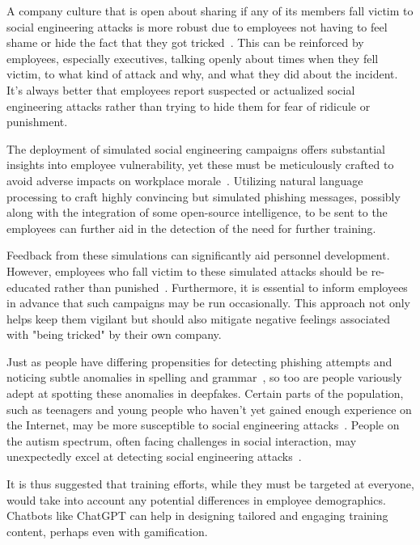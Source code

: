 A company culture that is open about sharing if any of its members fall victim to social engineering attacks is more robust due to employees not having to feel shame or hide the fact that they got tricked~\citep{hadnagy_Social_Engineering_The_Science_2018}. This can be reinforced by employees, especially executives, talking openly about times when they fell victim, to what kind of attack and why, and what they did about the incident. It's always better that employees report suspected or actualized social engineering attacks rather than trying to hide them for fear of ridicule or punishment.

The deployment of simulated social engineering campaigns offers substantial insights into employee vulnerability, yet these must be meticulously crafted to avoid adverse impacts on workplace morale~\citep{mitnick_The_Art_of_Deception_2003}. Utilizing natural language processing to craft highly convincing but simulated phishing messages, possibly along with the integration of some open-source intelligence, to be sent to the employees can further aid in the detection of the need for further training.

Feedback from these simulations can significantly aid personnel development. However, employees who fall victim to these simulated attacks should be re-educated rather than punished~\citep{mitnick_The_Art_of_Deception_2003}. Furthermore, it is essential to inform employees in advance that such campaigns may be run occasionally. This approach not only helps keep them vigilant but should also mitigate negative feelings associated with "being tricked" by their own company.

%
%
Just as people have differing propensities for detecting phishing attempts and noticing subtle anomalies in spelling and grammar~\citep{nicholson_Investigating_Teenagers_Detect_Phishing_2020, neupane_Social_Disorders_Facilitate_SE_2018}, so too are people variously adept at spotting these anomalies in deepfakes. Certain parts of the population, such as teenagers and young people who haven't yet gained enough experience on the Internet, may be more susceptible to social engineering attacks~\citep{nicholson_Investigating_Teenagers_Detect_Phishing_2020}. People on the autism spectrum, often facing challenges in social interaction, may unexpectedly excel at detecting social engineering attacks~\citep{neupane_Social_Disorders_Facilitate_SE_2018}.

It is thus suggested that training efforts, while they must be targeted at everyone, would take into account any potential differences in employee demographics. Chatbots like ChatGPT can help in designing tailored and engaging training content, perhaps even with gamification.





